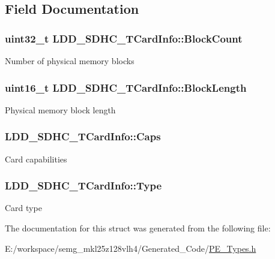 \subsection{Field Documentation}
\hypertarget{struct_l_d_d___s_d_h_c___t_card_info_aaf0587f4fc0e52a160d0ac2a1106c4e9}{
\subsubsection[{Block\-Count}]{\setlength{\rightskip}{0pt plus 5cm}uint32\-\_\-t L\-D\-D\-\_\-\-S\-D\-H\-C\-\_\-\-T\-Card\-Info\-::\-Block\-Count}}\label{struct_l_d_d___s_d_h_c___t_card_info_aaf0587f4fc0e52a160d0ac2a1106c4e9}
Number of physical memory blocks \hypertarget{struct_l_d_d___s_d_h_c___t_card_info_a46cbdea4ece83eeaa17410e9763cc3a9}{
\subsubsection[{Block\-Length}]{\setlength{\rightskip}{0pt plus 5cm}uint16\-\_\-t L\-D\-D\-\_\-\-S\-D\-H\-C\-\_\-\-T\-Card\-Info\-::\-Block\-Length}}\label{struct_l_d_d___s_d_h_c___t_card_info_a46cbdea4ece83eeaa17410e9763cc3a9}
Physical memory block length \hypertarget{struct_l_d_d___s_d_h_c___t_card_info_a591c22d1aa49944325b35c63d2bf8199}{
\subsubsection[{Caps}]{ L\-D\-D\-\_\-\-S\-D\-H\-C\-\_\-\-T\-Card\-Info\-::\-Caps}}\label{struct_l_d_d___s_d_h_c___t_card_info_a591c22d1aa49944325b35c63d2bf8199}
Card capabilities \hypertarget{struct_l_d_d___s_d_h_c___t_card_info_ab2b86f6fe821778459edd351d08eb4bd}{
\subsubsection[{Type}]{ L\-D\-D\-\_\-\-S\-D\-H\-C\-\_\-\-T\-Card\-Info\-::\-Type}}\label{struct_l_d_d___s_d_h_c___t_card_info_ab2b86f6fe821778459edd351d08eb4bd}
Card type 

The documentation for this struct was generated from the following file\-:\begin{DoxyCompactItemize}
\item 
E\-:/workspace/semg\-\_\-mkl25z128vlh4/\-Generated\-\_\-\-Code/\hyperlink{_p_e___types_8h}{P\-E\-\_\-\-Types.\-h}\end{DoxyCompactItemize}
